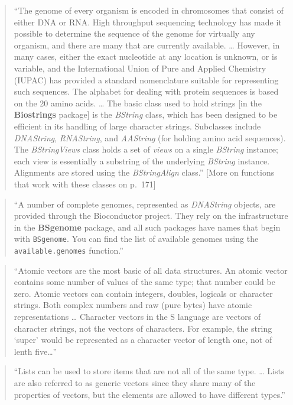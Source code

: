 \documentclass[]{tufte-book}
\begin{document}
\begin{quote}
``The genome of every organism is encoded in chromosomes that consist of either
DNA or RNA. High throughput sequencing technology has made it possible to determine
the sequence of the genome for virtually any organism, and there are many that are
currently available. \ldots{} However, in many cases, either the exact nucleotide at
any location is unknown, or is variable, and the International Union of Pure and
Applied Chemistry (IUPAC) has provided a standard nomenclature suitable for
representing such sequences. The alphabet for dealing with protein sequences
is based on the 20 amino acids. \ldots{} The basic class used to hold strings {[}in the
\textbf{Biostrings} package{]} is the \emph{BString} class, which has been designed to be
efficient in its handling of large character strings. Subclasses include
\emph{DNAString}, \emph{RNAString}, and \emph{AAString} (for holding amino acid sequences).
The \emph{BStringViews} class holds a set of \emph{views} on a single \emph{BString} instance;
each view is essentially a substring of the underlying \emph{BString} instance. Alignments
are stored using the \emph{BStringAlign} class.'' \citep{gentleman2008r} {[}More on functions that
work with these classes on p.~171{]}
\end{quote}

\begin{quote}
``A number of complete genomes, represented as \emph{DNAString} objects, are provided
through the Bioconductor project. They rely on the infrastructure in the \textbf{BSgenome}
package, and all such packages have names that begin with \texttt{BSgenome}. You can find the
list of available genomes using the \texttt{available.genomes} function.'' \citep{gentleman2008r}
\end{quote}

\begin{quote}
``Atomic vectors are the most basic of all data structures. An atomic vector
contains some number of values of the same type; that number could be zero.
Atomic vectors can contain integers, doubles, logicals or character strings.
Both complex numbers and raw (pure bytes) have atomic representations \ldots{}
Character vectors in the S language are vectors of character strings, not the
vectors of characters. For example, the string `super' would be represented as
a character vector of length one, not of lenth five\ldots{}'' \citep{gentleman2008r}
\end{quote}

\begin{quote}
``Lists can be used to store items that are not all of the same type. \ldots{}
Lists are also referred to as generic vectors since they share many of the properties
of vectors, but the elements are allowed to have different types.'' \citep{gentleman2008r}
\end{quote}
\end{document}
